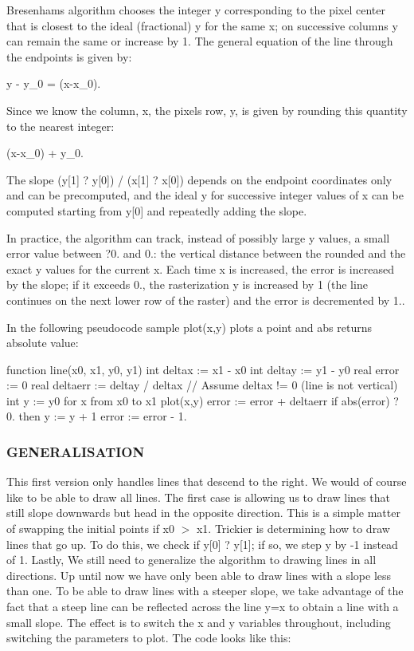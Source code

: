 Bresenham\textquotesingle{}s algorithm chooses the integer y corresponding to the pixel center that is closest to the ideal (fractional) y for the same x; on successive columns y can remain the same or increase by 1. The general equation of the line through the endpoints is given by\+: \begin{DoxyVerb}y - y_0 =  (x-x_0).
\end{DoxyVerb}


Since we know the column, x, the pixel\textquotesingle{}s row, y, is given by rounding this quantity to the nearest integer\+: \begin{DoxyVerb} (x-x_0) + y_0.
\end{DoxyVerb}


The slope (y\mbox{[}1\mbox{]} ? y\mbox{[}0\mbox{]}) / (x\mbox{[}1\mbox{]} ? x\mbox{[}0\mbox{]}) depends on the endpoint coordinates only and can be precomputed, and the ideal y for successive integer values of x can be computed starting from y\mbox{[}0\mbox{]} and repeatedly adding the slope.

In practice, the algorithm can track, instead of possibly large y values, a small error value between ?0. and 0.\+: the vertical distance between the rounded and the exact y values for the current x. Each time x is increased, the error is increased by the slope; if it exceeds 0., the rasterization y is increased by 1 (the line continues on the next lower row of the raster) and the error is decremented by 1..

In the following pseudocode sample plot(x,y) plots a point and abs returns absolute value\+:

function line(x0, x1, y0, y1) int deltax \+:= x1 -\/ x0 int deltay \+:= y1 -\/ y0 real error \+:= 0 real deltaerr \+:= deltay / deltax // Assume deltax != 0 (line is not vertical) int y \+:= y0 for x from x0 to x1 plot(x,y) error \+:= error + deltaerr if abs(error) ? 0. then y \+:= y + 1 error \+:= error -\/ 1.

\subsubsection*{G\+E\+N\+E\+R\+A\+L\+I\+S\+A\+T\+I\+ON}

This first version only handles lines that descend to the right. We would of course like to be able to draw all lines. The first case is allowing us to draw lines that still slope downwards but head in the opposite direction. This is a simple matter of swapping the initial points if x0 $>$ x1. Trickier is determining how to draw lines that go up. To do this, we check if y\mbox{[}0\mbox{]} ? y\mbox{[}1\mbox{]}; if so, we step y by -\/1 instead of 1. Lastly, We still need to generalize the algorithm to drawing lines in all directions. Up until now we have only been able to draw lines with a slope less than one. To be able to draw lines with a steeper slope, we take advantage of the fact that a steep line can be reflected across the line y=x to obtain a line with a small slope. The effect is to switch the x and y variables throughout, including switching the parameters to plot. The code looks like this\+:

